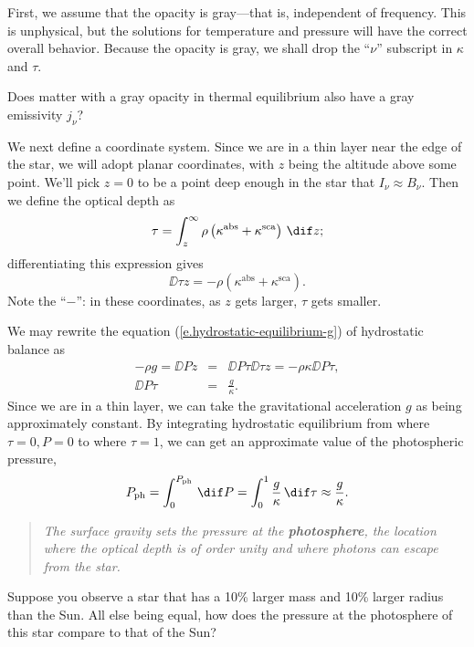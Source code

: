 First, we assume that the opacity is gray---that is, independent of frequency. This is unphysical, but the solutions for temperature and pressure will have the correct overall behavior. Because the opacity is gray, we shall drop the ``$\nu$'' subscript in $\kappa$ and $\tau$.

\begin{exercisebox}
Does matter with a gray opacity in thermal equilibrium also have a gray emissivity $j_{\nu}$?
\end{exercisebox}

We next define a coordinate system. Since we are in a thin layer near the edge of the star, we will adopt planar coordinates, with $z$ being the altitude above some point. We'll pick $z=0$ to be a point deep enough in the star that $I_{\nu}\approx B_{\nu}$. Then we define the optical depth as
\begin{equation}\label{e.optical-depth-planar}
	\tau = \int_{z}^{\infty} \rho\left(\kappa^{\mathrm{abs}}+\kappa^{\mathrm{sca}}\right)\,\dif z ;
\end{equation}
differentiating this expression gives
\[
	\DD{\tau}{z} = -\rho\left(\kappa^{\mathrm{abs}}+\kappa^{\mathrm{sca}}\right).
\]
Note the ``$-$'': in these coordinates, as $z$ gets larger, $\tau$ gets smaller.

We may rewrite the equation (\ref{e.hydrostatic-equilibrium-g}) of hydrostatic balance as
\begin{eqnarray}
	-\rho g = \DD{P}{z} &=& \DD{P}{\tau}\DD{\tau}{z} = -\rho\kappa\DD{P}{\tau},\nonumber\\
	\DD{P}{\tau} &=& \frac{g}{\kappa}.
\label{e.P-tau}
\end{eqnarray}
Since we are in a thin layer, we can take the gravitational acceleration $g$ as being approximately constant. By integrating hydrostatic equilibrium from where $\tau = 0, P = 0$ to where $\tau = 1$, we can get an approximate value of the photospheric pressure,
\[
	P_{\mathrm{ph}} = \int_{0}^{P_{\mathrm{ph}}}\,\dif P = \int_{0}^{1}\frac{g}{\kappa}\,\dif\tau \approx \frac{g}{\kappa}.
\]
\begin{quote}
\emph{The surface gravity sets the pressure at the \textbf{photosphere}, the location where the optical depth is of order unity and where photons can escape from the star.}
\end{quote}

\begin{exercisebox}
Suppose you observe a star that has a 10\% larger mass and 10\% larger radius than the Sun. All else being equal, how does the pressure at the photosphere of this star compare to that of the Sun?
\end{exercisebox}

